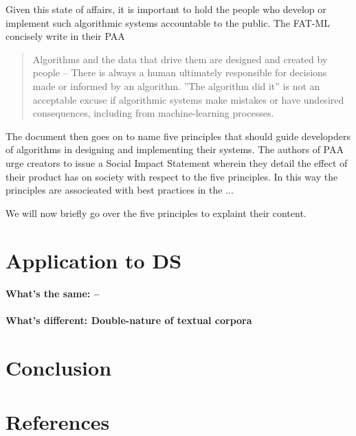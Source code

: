 \documentclass{article}
\begin{document}
Given this state of affairs, it is important to hold the people who develop or implement such algorithmic systems accountable to the public. The FAT-ML concisely write in their PAA \cite{principles}
\begin{quote}
Algorithms and the data that drive them are designed and created by people -- There is always a human ultimately responsible for decisions made or informed by an algorithm. ''The algorithm did it'' is not an acceptable excuse if algorithmic systems make mistakes or have undesired consequences, including from machine-learning processes.
\end{quote}

The document then goes on to name five principles that should guide developders of algorithms in designing and implementing their systems. The authors of PAA urge creators to issue a Social Impact Statement wherein they detail the effect of their product has on society with respect to the five principles. In this way the principles are associeated with best practices in the ...

We will now briefly go over the five principles to explaint their content.

\section{Application to DS}\hypertarget{sec4}{ }
\paragraph{What's the same: --}
\paragraph{What's different: Double-nature of textual corpora}
\section{Conclusion}

\section{References}\hypertarget{sec5}{ }
\end{document}
